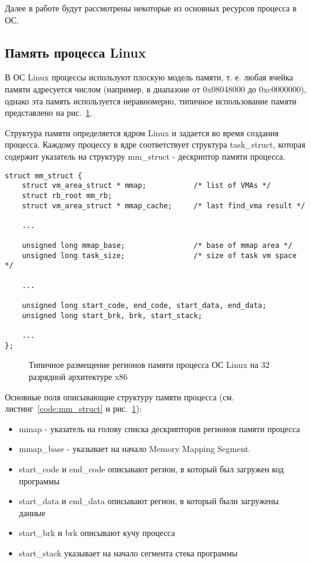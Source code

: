 Далее в работе будут рассмотрены некоторые из основных ресурсов процесса в ОС.

\subsection{Память процесса Linux}\label{linux_memory}

В ОС Linux процессы используют плоскую модель памяти, т. е. любая ячейка памяти адресуется числом (например, в диапазоне от 0x08048000 до 0xc0000000), однако эта память используется неравномерно, типичное использование памяти представлено на рис.~\ref{pic:memory_layout}.

Структура памяти определяется ядром Linux и задается во время создания процесса. Каждому процессу в ядре соответствует структура task\_struct, которая содержит указатель на структуру mm\_struct - дескриптор памяти процесса.

\begin{lstlisting}[caption=Выборка из структуры struct mm\_struct, label=code:mm_struct]
struct mm_struct {
    struct vm_area_struct * mmap;           /* list of VMAs */
    struct rb_root mm_rb;
    struct vm_area_struct * mmap_cache;     /* last find_vma result */

    ...

    unsigned long mmap_base;                /* base of mmap area */
    unsigned long task_size;                /* size of task vm space */

    ...

    unsigned long start_code, end_code, start_data, end_data;
    unsigned long start_brk, brk, start_stack;

    ...
};
\end{lstlisting}

\begin{figure}[h]
\caption{Типичное размещение регионов памяти процесса ОС Linux на 32 разрядной архитектуре x86}
\label{pic:memory_layout}
\end{figure}

Основные поля описывающие структуру памяти процесса (см. листинг~\ref{code:mm_struct} и рис.~\ref{pic:memory_layout}):

\begin{itemize}

    \item mmap - указатель на голову списка дескрипторов регионов памяти процесса
    \item mmap\_base - указывает на начало Memory Mapping Segment.
    \item start\_code и end\_code описывают регион, в который был загружен код программы
    \item start\_data и end\_data описывают регион, в который были загружены данные
    \item start\_brk и brk описывают кучу процесса
    \item start\_stack указывает на начало сегмента стека программы

\end{itemize}

